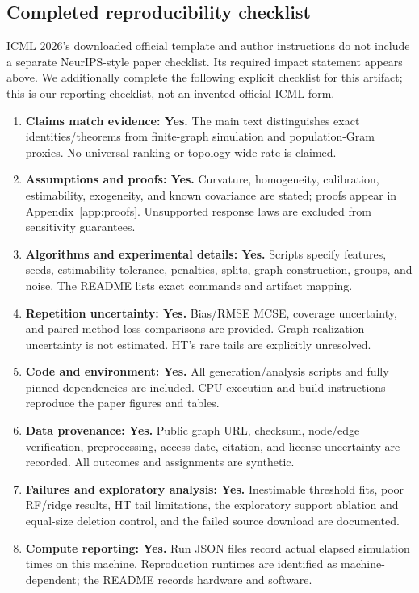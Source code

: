 \documentclass{article}
\begin{document}
\subsection*{Completed reproducibility checklist}
ICML 2026's downloaded official template and author instructions do not include a separate NeurIPS-style paper checklist. Its required impact statement appears above. We additionally complete the following explicit checklist for this artifact; this is our reporting checklist, not an invented official ICML form.
\begin{enumerate}[leftmargin=*,itemsep=1pt]
\item \textbf{Claims match evidence: Yes.} The main text distinguishes exact identities/theorems from finite-graph simulation and population-Gram proxies. No universal ranking or topology-wide rate is claimed.
\item \textbf{Assumptions and proofs: Yes.} Curvature, homogeneity, calibration, estimability, exogeneity, and known covariance are stated; proofs appear in Appendix~\ref{app:proofs}. Unsupported response laws are excluded from sensitivity guarantees.
\item \textbf{Algorithms and experimental details: Yes.} Scripts specify features, seeds, estimability tolerance, penalties, splits, graph construction, groups, and noise. The README lists exact commands and artifact mapping.
\item \textbf{Repetition uncertainty: Yes.} Bias/RMSE MCSE, coverage uncertainty, and paired method-loss comparisons are provided. Graph-realization uncertainty is not estimated. HT's rare tails are explicitly unresolved.
\item \textbf{Code and environment: Yes.} All generation/analysis scripts and fully pinned dependencies are included. CPU execution and build instructions reproduce the paper figures and tables.
\item \textbf{Data provenance: Yes.} Public graph URL, checksum, node/edge verification, preprocessing, access date, citation, and license uncertainty are recorded. All outcomes and assignments are synthetic.
\item \textbf{Failures and exploratory analysis: Yes.} Inestimable threshold fits, poor RF/ridge results, HT tail limitations, the exploratory support ablation and equal-size deletion control, and the failed source download are documented.
\item \textbf{Compute reporting: Yes.} Run JSON files record actual elapsed simulation times on this machine. Reproduction runtimes are identified as machine-dependent; the README records hardware and software.

\end{enumerate}
\end{document}
